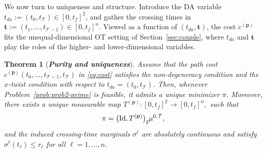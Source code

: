 \documentclass[11pt]{article}
\newcommand{\calT}{{\mathcal T}}
\newtheorem{theorem}{Theorem}
\begin{document}
We now turn to uniqueness and structure. Introduce the DA variable $t_{da} := (t_0,t_\calT) \in [0,t_f]^2$, and gather the crossing times in $\mathbf t := (t_1,\dots,t_{\calT-1}) \in [0,t_f]^n$. Viewed as a function of $(t_{da},\mathbf t)$, the cost $c^{(\mathbf{p})}$ fits the unequal-dimensional OT setting of Section~\ref{sec:couple}, where $t_{da}$ and $\mathbf t$ play the roles of the higher- and lower-dimensional variables.

\begin{theorem}[\bf \textit{Purity and uniqueness}]\label{thm:unique-coupled-line}
Assume that the path cost $c^{(\mathbf{p})}(t_0,\dots,t_{\calT-1},t_\calT)$ in \eqref{eq:cost} satisfies the non-degeneracy condition and the $x$-twist condition with respect to $t_{da}=(t_0,t_\calT)$. Then, whenever Problem~\ref{prob:prob2-prime} is feasible, it admits a unique minimizer $\pi$. Moreover, there exists a unique measurable map $T^{(\mathbf p)} : [0,t_f]^2 \to [0,t_f]^n,$ such that
\[
\pi = \big({\rm Id},T^{(\mathbf p)}\big)_{\sharp}\mu^{0,\calT},
\]
and the induced crossing-time marginals $\sigma^\ell$ are absolutely continuous and satisfy $\sigma^\ell(t_\ell)\le r_\ell$ for all $\ell=1,\dots,n$.
\end{theorem}
\end{document}
